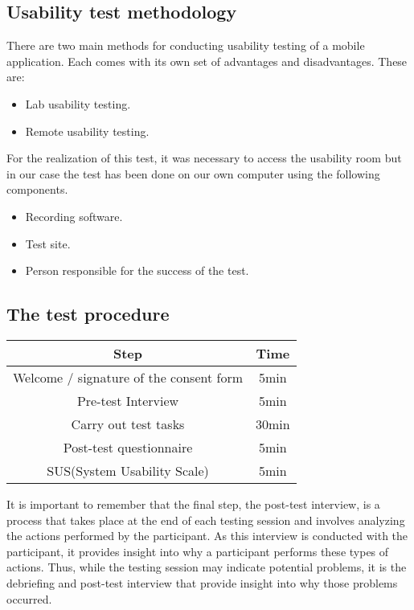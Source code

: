 \documentclass[./main.tex]{subfiles}
\begin{document}
\subsection{Usability test methodology}

There are two main methods for conducting usability testing of a mobile application. Each comes with its own set of advantages and disadvantages. These are:

\begin{itemize}
	\item Lab usability testing.
	\item Remote usability testing.
\end{itemize}

For the realization of this test, it was necessary to access the usability room but in our case the test has been done on our own computer using the following components. 
\begin{itemize}
	\item Recording software.
	\item Test site.
	\item Person responsible for the success of the test.
\end{itemize}


\subsection{The test procedure}{}

\begin{tabular}{| c | c |}
	\hline
	Step & Time \\ \hline
	Welcome / signature of the consent form & 5min \\ \hline
	Pre-test Interview & 5min \\ \hline
	Carry out test tasks & 30min \\ \hline
	Post-test questionnaire & 5min \\ \hline
	SUS(System Usability Scale) & 5min \\ \hline
\end{tabular} 
\hfill

It is important to remember that the final step, the post-test interview, is a process that takes place at the end of each testing session and involves analyzing the actions performed by the participant. As this interview is conducted with the participant, it provides insight into why a participant performs these types of actions. Thus, while the testing session may indicate potential problems, it is the debriefing and post-test interview that provide insight into why those problems occurred.
\end{document}
